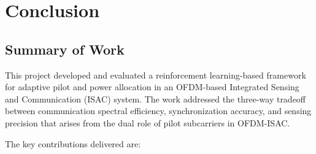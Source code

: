\chapter{Conclusion}

\section{Summary of Work}

This project developed and evaluated a reinforcement learning-based framework for adaptive pilot and power allocation in an OFDM-based Integrated Sensing and Communication (ISAC) system. The work addressed the three-way tradeoff between communication spectral efficiency, synchronization accuracy, and sensing precision that arises from the dual role of pilot subcarriers in OFDM-ISAC.

The key contributions delivered are:

